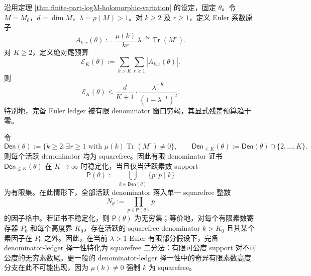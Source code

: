 \begin{theorem}\label{distill:euclid_elements-exhaustion_and_finite_budget_closure_families-zeta-squarefree-euler-tail-exhaustion}
沿用定理 \ref{thm:finite-part-logM-holomorphic-variation} 的设定，固定 \(\theta\)。令 \(M=M_\theta\)，\(d=\dim M\)，\(\lambda=\rho(M)>1\)。对 \(k\ge2\) 及 \(r\ge1\)，定义 Euler 系数原子
\[
A_{k,r}(\theta):=\frac{\mu(k)}{kr}\,\lambda^{-kr}\operatorname{Tr}(M^r).
\]
对 \(K\ge2\)，定义绝对尾预算
\[
\mathcal E_K(\theta):=\sum_{k>K}\sum_{r\ge1}|A_{k,r}(\theta)|.
\]
则
\[
\boxed{\;
\mathcal E_K(\theta)\le
\frac{d}{K+1}\cdot\frac{\lambda^{-K}}{(1-\lambda^{-1})^2}.
\;}
\]
特别地，完备 Euler ledger 被有限 denominator 窗口穷竭，其显式残差预算趋于零。

令
\[
\mathsf{Den}(\theta):=\{k\ge2:\exists r\ge1\text{ with }\mu(k)\operatorname{Tr}(M^r)\ne0\},
\qquad
\mathsf{Den}_{\le K}(\theta):=\mathsf{Den}(\theta)\cap\{2,\ldots,K\}.
\]
则每个活跃 denominator 均为 squarefree。因此有限 denominator 证书 \(\mathsf{Den}_{\le K}(\theta)\) 在 \(K\to\infty\) 时稳定化，当且仅当活跃素数 support
\[
\mathsf P(\theta):=\bigcup_{k\in\mathsf{Den}(\theta)}\{p:p\mid k\}
\]
为有限集。在此情形下，全部活跃 denominator 落入单一 squarefree 整数
\[
N_\theta:=\prod_{p\in\mathsf P(\theta)}p
\]
的因子格中。若证书不稳定化，则 \(\mathsf P(\theta)\) 为无穷集；等价地，对每个有限素数寄存器 \(P_0\) 和每个高度界 \(K_0\)，存在活跃的 squarefree denominator \(k>K_0\) 且其某个素因子在 \(P_0\) 之外。因此，在当前 \(\lambda>1\) Euler 有限部分假设下，完备 denominator-ledger 择一性特化为 squarefree 二分法：有限可公度 support 对不可公度的无穷素数尾。更一般的 denominator-ledger 择一性中的奇异有限素数高度分支在此不可能出现，因为 \(\mu(k)\ne0\) 强制 \(k\) 为 squarefree。
\end{theorem}
